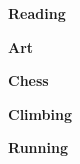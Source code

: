 \documentclass[]{commands}
\begin{document}
\begin{aside}
\faBook \hspace{3mm} \textbf{Reading}

\faPaintBrush \hspace{3mm} \textbf{Art}

\faTrophy \hspace{3mm} \textbf{Chess}

\faSigning \hspace{3mm} \textbf{Climbing}

\faBattery \hspace{3mm} \textbf{Running}

\end{aside}

\newcommand{\eduspace}{\vspace*{0.85mm}}
\newcommand{\eduspaceII}{\vspace*{0.8mm}}
\newcommand{\jobspace}{\vspace*{-4.2mm}}

\end{document}
